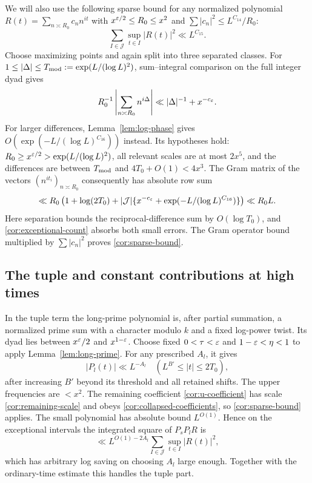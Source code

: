 We will also use the following sparse bound for any normalized
polynomial $R(t)=\sum_{n\asymp R_0}c_nn^{it}$ with
$x^{\varepsilon/2}\leq R_0\leq x^2$ and
$\sum|c_n|^2\leq L^{C_{14}}/R_0$:
\begin{equation}\label{cor:sparse-bound}
 \sum_{I\in\mathcal J}\sup_{t\in I}|R(t)|^2\ll L^{C_{15}}.
\end{equation}
Choose maximizing points and again split into three separated classes.
For $1\leq|\Delta|\leq T_{\rm mod}:=\exp(L/(\log L)^2)$,
sum--integral comparison on the full integer dyad gives
\[
 R_0^{-1}\left|\sum_{n\asymp R_0}n^{i\Delta}\right|
       \ll |\Delta|^{-1}+x^{-c_\varepsilon}.
\]
For larger differences, Lemma~\ref{lem:log-phase} gives
$O(\exp(-L/(\log L)^{C_{16}}))$ instead.  Its hypotheses hold:
$R_0\geq x^{\varepsilon/2}>\exp(L/(\log L)^2)$, all relevant scales are
at most $2x^5$, and the differences are between $T_{\rm mod}$ and
$4T_0+O(1)<4x^3$.  The Gram matrix of the vectors
$(n^{it_i})_{n\asymp R_0}$ consequently has absolute row sum
\[
 \ll R_0\left(1+\log(2T_0)
       +|\mathcal J|\{x^{-c_\varepsilon}
                   +\exp(-L/(\log L)^{C_{16}})\}\right)
 \ll R_0L.
\]
Here separation bounds the reciprocal-difference sum by $O(\log T_0)$,
and \eqref{cor:exceptional-count} absorbs both small errors.  The Gram
operator bound multiplied by $\sum|c_n|^2$ proves
\eqref{cor:sparse-bound}.

\subsection{The tuple and constant contributions at high times}

In the tuple term the long-prime polynomial is, after partial summation,
a normalized prime sum with a character modulo $k$ and a fixed
log-power twist.  Its dyad lies between $x^\varepsilon/2$ and
$x^{1-\varepsilon}$.  Choose fixed $0<\tau<\varepsilon$ and
$1-\varepsilon<\eta<1$ to apply Lemma~\ref{lem:long-prime}.  For any
prescribed $A_l$, it gives
\begin{equation}\label{cor:long-prime-saving}
 |P_l(t)|\ll L^{-A_l}
       \quad(L^{B'}\leq|t|\leq2T_0),
\end{equation}
after increasing $B'$ beyond its threshold and all retained shifts.
The upper frequencies are $<x^2$.  The remaining coefficient
\eqref{cor:u-coefficient} has scale \eqref{cor:remaining-scale} and
obeys \eqref{cor:collapsed-coefficients}, so
\eqref{cor:sparse-bound} applies.  The small polynomial has absolute
bound $L^{O(1)}$.  Hence on the exceptional intervals the integrated
square of $P_sP_lR$ is
\[
 \ll L^{O(1)-2A_l}
       \sum_{I\in\mathcal J}\sup_{t\in I}|R(t)|^2,
\]
which has arbitrary log saving on choosing $A_l$ large enough.
Together with the ordinary-time estimate this handles the tuple part.

